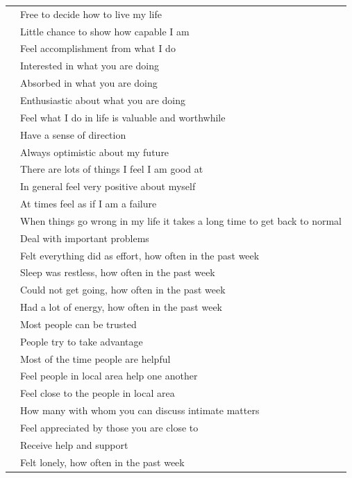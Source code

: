 \documentclass[a4paper,12pt]{article}
\begin{document}
\begin{table}[h]
\begin{tabular}{ll}
\rowcolor{lightgray} & Free to decide how to live my life\\
\rowcolor{lightgray} & Little chance to show how capable I am\\
\rowcolor{lightgray} & Feel accomplishment from what I do\\
\rowcolor{lightgray} & Interested in what you are doing\\
\rowcolor{lightgray} & Absorbed in what you are doing\\
\rowcolor{lightgray} & Enthusiastic about what you are doing\\
\rowcolor{lightgray} & Feel what I do in life is valuable and worthwhile\\
\rowcolor{lightgray} & Have a sense of direction\\
\rowcolor{lightgray} & Always optimistic about my future\\
\rowcolor{lightgray} & There are lots of things I feel I am good at\\
\rowcolor{lightgray} & In general feel very positive about myself\\
\rowcolor{lightgray} & At times feel as if I am a failure\\
\rowcolor{lightgray} & When things go wrong in my life it takes a long time to get back to normal\\
\rowcolor{lightgray}\multirow{-14}{*}{Functioning} & Deal with important problems\\

\rowcolor{white} & Felt everything did as effort, how often in the past week\\
\rowcolor{white} & Sleep was restless, how often in the past week\\
\rowcolor{white} & Could not get going, how often in the past week\\
\rowcolor{white}\multirow{-4}{*}{Vitality} & Had a lot of energy, how often in the past week\\

\rowcolor{lightgray} &  Most people can be trusted\\
\rowcolor{lightgray} &  People try to take advantage\\
\rowcolor{lightgray} &  Most of the time people are helpful\\
\rowcolor{lightgray} &  Feel people in local area help one another\\
\rowcolor{lightgray}\multirow{-5}{*}{Community wellbeing}& Feel close to the people in local area\\

\rowcolor{white} & How many with whom you can discuss intimate matters\\
\rowcolor{white} & Feel appreciated by those you are close to\\
\rowcolor{white} & Receive help and support\\
\rowcolor{white}\multirow{-4}{*}{Supportive relationships} & Felt lonely, how often in the past week\\
\hline
\end{tabular}
\egroup
\end{table}
\end{document}
